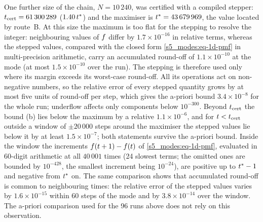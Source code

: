 One further size of the chain, $N=10\,240$, was certified with a compiled stepper: $t_{\mathrm{cert}}=61\,300\,289$
($1.40\,t^{*}$) and the maximiser is $t^{*}=43\,679\,969$, the value located by route~B.
At this size the maximum is too flat for the stepping to resolve the integer: neighbouring values of $f$ differ
by $1.7\times10^{-16}$ in relative terms, whereas the stepped values, compared with the closed form
\eqref{s5_modes:eq-1d-pmf} in multi-precision arithmetic, carry an accumulated round-off of $1.1\times10^{-10}$ at
the mode (at most $1.5\times10^{-10}$ over the run).
The stepping is therefore used only where its margin exceeds its worst-case round-off. All its operations act on
non-negative numbers, so the relative error of every stepped quantity grows by at most five units of round-off per
step, which gives the a-priori bound $3.4\times10^{-8}$ for the whole run; underflow affects only components below
$10^{-300}$. Beyond $t_{\mathrm{cert}}$ the bound (b) lies below the maximum by a relative $1.1\times10^{-6}$, and for
$t<t_{\mathrm{cert}}$ outside a window of $\pm20\,000$ steps around the maximiser the stepped values lie below it by at least
$1.5\times10^{-7}$; both statements survive the a-priori bound. Inside the window the increments
$f(t+1)-f(t)$ of \eqref{s5_modes:eq-1d-pmf}, evaluated in 60-digit arithmetic at all $40\,001$ times (24
slowest terms; the omitted ones are bounded by $10^{-428}$, the smallest increment being $10^{-24}$), are positive up
to $t^{*}-1$ and negative from $t^{*}$ on. The same comparison shows that accumulated round-off is common to
neighbouring times: the relative error of the stepped values varies by $1.6\times10^{-15}$ within 60 steps of the mode
and by $3.8\times10^{-14}$ over the window. The a-priori comparison used for the 96 runs above
does not rely on this observation.

